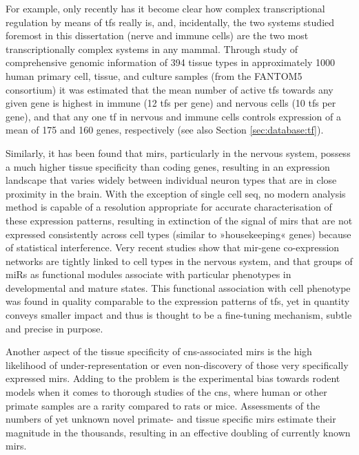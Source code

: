 For example, only recently has it become clear how complex transcriptional regulation by means of \acp{tf} really is, and, incidentally, the two systems studied foremost in this dissertation (nerve and immune cells) are the two most transcriptionally complex systems in any mammal. Through study of comprehensive genomic information of 394 tissue types in approximately 1000 human primary cell, tissue, and culture samples (from the FANTOM5 consortium) it was estimated that the mean number of active \acp{tf} towards any given gene is highest in immune (12 \acp{tf} per gene) and nervous cells (10 \acp{tf} per gene), and that any one \ac{tf} in nervous and immune cells controls expression of a mean of 175 and 160 genes, respectively\cite{Marbach2016} (see also Section \ref{sec:database:tf}). 

Similarly, it has been found that \acp{mir}, particularly in the nervous system, possess a much higher tissue specificity than coding genes, resulting in an expression landscape that varies widely between individual neuron types that are in close proximity in the brain. With the exception of single cell \ac{seq}, no modern analysis method is capable of a resolution appropriate for accurate characterisation of these expression patterns, resulting in extinction of the signal of \acp{mir} that are not expressed consistently across cell types (similar to »housekeeping« genes) because of statistical interference. Very recent studies show that \ac{mir}-gene co-expression networks are tightly linked to cell types in the nervous system, and that groups of miRs as functional modules associate with particular phenotypes in developmental and mature states\cite{Nowakowski2018}. This functional association with cell phenotype was found in quality comparable to the expression patterns of \acp{tf}, yet in quantity conveys smaller impact and thus is thought to be a fine-tuning mechanism, subtle and precise in purpose. 

Another aspect of the tissue specificity of \ac{cns}-associated \acp{mir} is the high likelihood of under-representation or even non-discovery of those very specifically expressed \acp{mir}. Adding to the problem is the experimental bias towards rodent models when it comes to thorough studies of the \ac{cns}, where human or other primate samples are a rarity compared to rats or mice. Assessments of the numbers of yet unknown novel primate- and tissue specific \acp{mir} estimate their magnitude in the thousands\cite{Londin2015}, resulting in an effective doubling of currently known \acp{mir}.

